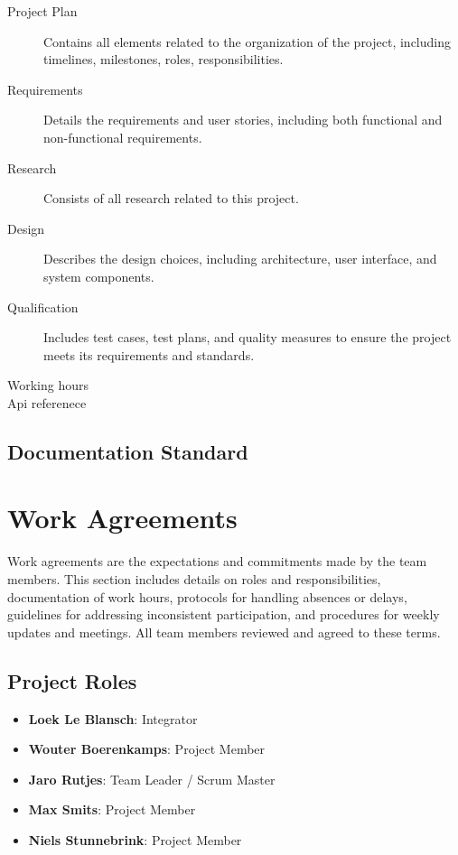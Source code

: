 \documentclass{projdoc}
\begin{document}
\begin{description}
	\item[Project Plan] Contains all elements related to the organization of the
	 project, including timelines, milestones, roles, responsibilities.
	\item[Requirements] Details the requirements and 
	user stories, including both functional and non-functional requirements. 
	\item[Research] Consists of all research related to this project.
	\item[Design] Describes the design choices, including architecture,
	 user interface, and system components.
	\item[Qualification] Includes test cases, test plans, and quality 
	measures to ensure the project meets its requirements and standards.
	\item[Working hours] 
	\item[Api referenece]  
\end{description}

\subsection{Documentation Standard}
\newpage

\section{Work Agreements}
Work agreements are the expectations and commitments made by the team members. 
This section includes details on roles and responsibilities, documentation of 
work hours, protocols for handling absences or delays, guidelines for addressing
 inconsistent participation, and procedures for weekly updates and meetings. All
  team members reviewed and agreed to these terms.

\subsection{Project Roles}
\begin{itemize}
	\item \textbf{Loek Le Blansch}: Integrator
	\item \textbf{Wouter Boerenkamps}: Project Member
	\item \textbf{Jaro Rutjes}: Team Leader / Scrum Master
	\item \textbf{Max Smits}: Project Member
	\item \textbf{Niels Stunnebrink}: Project Member
\end{itemize}
\end{document}
